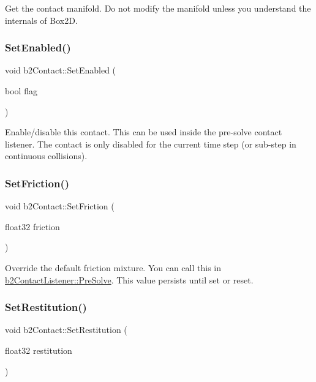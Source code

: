 Get the contact manifold. Do not modify the manifold unless you understand the internals of Box2D. \mbox{\label{classb2_contact_a6edf582f8c161d6632854cddefe55a0c}} 
\subsubsection{\texorpdfstring{Set\+Enabled()}{SetEnabled()}}
{\footnotesize\ttfamily void b2\+Contact\+::\+Set\+Enabled (\begin{DoxyParamCaption}\item[{bool}]{flag }\end{DoxyParamCaption})\hspace{0.3cm}{\ttfamily [inline]}}

Enable/disable this contact. This can be used inside the pre-\/solve contact listener. The contact is only disabled for the current time step (or sub-\/step in continuous collisions). \mbox{\label{classb2_contact_a5e8fbb6bb2966ac84272bb0ea9d2e4c7}} 
\subsubsection{\texorpdfstring{Set\+Friction()}{SetFriction()}}
{\footnotesize\ttfamily void b2\+Contact\+::\+Set\+Friction (\begin{DoxyParamCaption}\item[{float32}]{friction }\end{DoxyParamCaption})\hspace{0.3cm}{\ttfamily [inline]}}

Override the default friction mixture. You can call this in \hyperlink{classb2_contact_listener_a416f85eb45a1099053402b15a19a7de0}{b2\+Contact\+Listener\+::\+Pre\+Solve}. This value persists until set or reset. \mbox{\label{classb2_contact_a24ca342c2bb766c53ef5ad04f5268fc1}} 
\subsubsection{\texorpdfstring{Set\+Restitution()}{SetRestitution()}}
{\footnotesize\ttfamily void b2\+Contact\+::\+Set\+Restitution (\begin{DoxyParamCaption}\item[{float32}]{restitution }\end{DoxyParamCaption})\hspace{0.3cm}{\ttfamily [inline]}}

